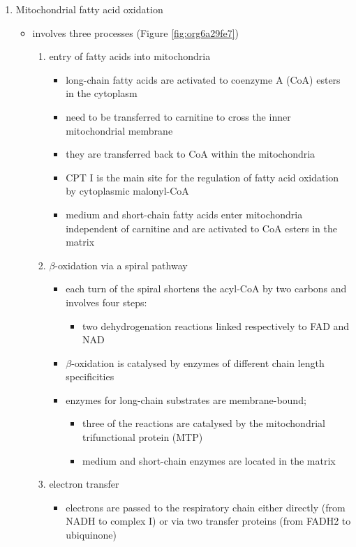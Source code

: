 \documentclass{scrartcl}
\begin{document}
\begin{enumerate}
\item Mitochondrial fatty acid oxidation
\label{sec:orgd649289}

\begin{itemize}
\item involves three processes (Figure \ref{fig:org6a29fe7})
\begin{enumerate}
\item entry of fatty acids into mitochondria
\begin{itemize}
\item long-chain fatty acids are activated to coenzyme A (CoA) esters
in the cytoplasm
\item need to be transferred to carnitine to cross the inner
mitochondrial membrane
\item they are transferred back to CoA within the mitochondria
\item CPT I is the main site for the regulation of fatty acid
oxidation by cytoplasmic malonyl-CoA
\item medium and short-chain fatty acids enter mitochondria
independent of carnitine and are activated to CoA esters in the
matrix
\end{itemize}
\item \(\beta\)-oxidation via a spiral pathway
\begin{itemize}
\item each turn of the spiral shortens the acyl-CoA by two carbons and involves four steps:
\begin{itemize}
\item two dehydrogenation reactions linked respectively to FAD and NAD
\end{itemize}
\item \(\beta\)-oxidation is catalysed by enzymes of different chain
length specificities
\item enzymes for long-chain substrates are membrane-bound;
\begin{itemize}
\item three of the reactions are catalysed by the mitochondrial
trifunctional protein (MTP)
\item medium and short-chain enzymes are located in the matrix
\end{itemize}
\end{itemize}
\item electron transfer
\begin{itemize}
\item electrons are passed to the respiratory chain either directly
(from NADH to complex I) or via two transfer proteins (from
FADH2 to ubiquinone)
\end{itemize}
\end{enumerate}
\end{itemize}


\end{enumerate}
\end{document}

